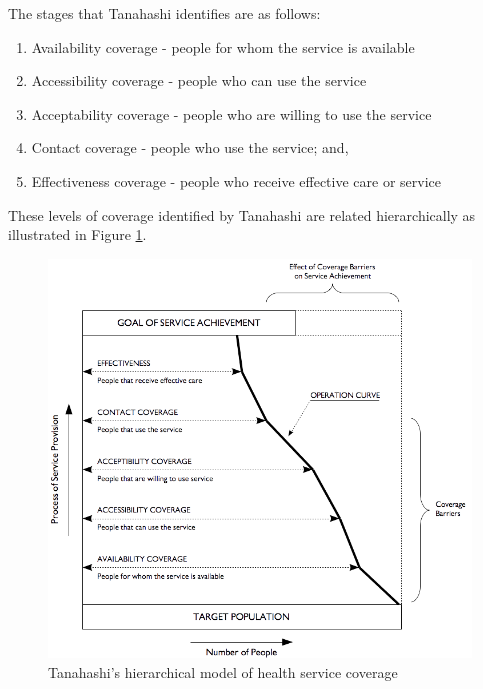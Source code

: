 \documentclass[12pt,a4paper]{article}
\begin{document}
The stages that Tanahashi identifies are as follows:

\begin{enumerate}
\def\labelenumi{\arabic{enumi}.}
\item
  Availability coverage - people for whom the service is available
\item
  Accessibility coverage - people who can use the service
\item
  Acceptability coverage - people who are willing to use the service
\item
  Contact coverage - people who use the service; and,
\item
  Effectiveness coverage - people who receive effective care or service
\end{enumerate}

These levels of coverage identified by Tanahashi are related hierarchically as illustrated in Figure \ref{fig:tanahashi}.

\begin{figure}[H]

{\centering \includegraphics[width=10.31in]{figures/coverageTanahashi} 

}

\caption{Tanahashi's hierarchical model of health service coverage}\label{fig:tanahashi}
\end{figure}
\end{document}
